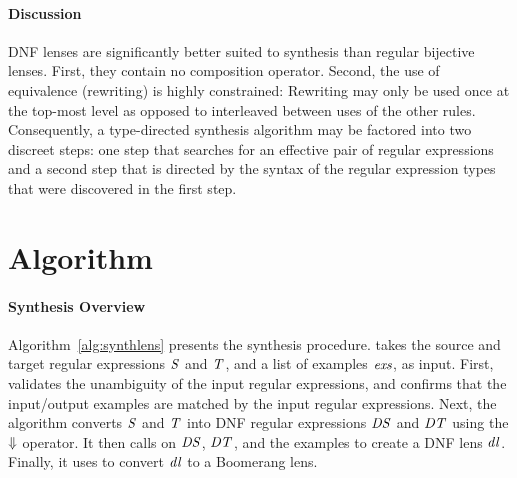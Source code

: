 \documentclass[acmsmall]{acmart}
\begin{document}
\paragraph*{Discussion} 
DNF lenses are significantly better suited to synthesis than regular
bijective lenses.  First, they contain no composition operator.
Second, the use of equivalence (rewriting) is highly constrained:  Rewriting
may only be used once at the top-most level as opposed to interleaved
between uses of the other rules.  Consequently, a type-directed synthesis
algorithm may be factored into two discreet steps: one step that
searches for an effective pair of regular expressions
and a second step that is directed by the syntax of the regular expression
types that were discovered in the first step.


\section{Algorithm}
\label{algorithm}

\paragraph*{Synthesis Overview}
Algorithm~\ref{alg:synthlens} presents the synthesis procedure.
\SynthLens{} takes the source and target regular
expressions $\mathit{S}$ and $\mathit{T}$, and a list of examples $\mathit{exs}$, as
input. First, \SynthLens{} validates the unambiguity of the input regular
expressions, and confirms that the input/output examples are matched by the
input regular expressions. Next, the algorithm converts
$\mathit{S}$ and $\mathit{T}$ into DNF regular expressions
$\mathit{DS}$ and $\mathit{DT}$
using the $\Downarrow$ operator.
It then calls \SynthDNFLens{}
on $\mathit{DS}$, $\mathit{DT}$, and the examples
to create a DNF lens $\mathit{dl}$.  
Finally, it uses \ToLens{} to convert $\mathit{dl}$ to a Boomerang lens.
\end{document}
